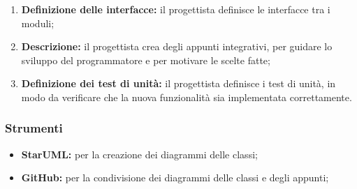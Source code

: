 \begin{itemize}
\begin{enumerate}
		      \item \textbf{Definizione delle interfacce:} il
		            progettista definisce le interfacce tra i moduli;

		      \item \textbf{Descrizione:} il progettista crea degli appunti
		            integrativi, per guidare lo sviluppo del programmatore e
		            per motivare le scelte fatte;

		      \item \textbf{Definizione dei test di unità:} il progettista
		            definisce i test di unità, in modo da verificare che la
		            nuova funzionalità sia implementata correttamente.
	      \end{enumerate}
\end{itemize}

\subsubsection{Strumenti}
\begin{itemize}
	\item \textbf{StarUML:} per la creazione dei diagrammi delle classi;
	\item \textbf{GitHub\g:} per la condivisione dei diagrammi delle classi e
	      degli appunti;
\end{itemize}

